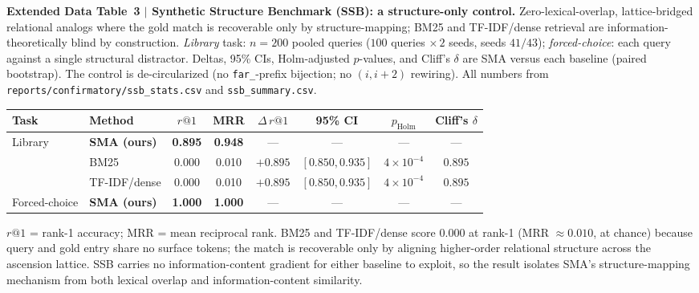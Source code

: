 \documentclass[pdflatex,sn-nature]{sn-jnl}
\newcommand{\edcaption}[1]{\par{\small #1}\par\smallskip}
\begin{document}
\begin{appendices}

\begin{table}[htbp]
\centering
\edcaption{\textbf{Extended Data Table~3 $|$ Synthetic Structure Benchmark (SSB): a
    structure-only control.}
  Zero-lexical-overlap, lattice-bridged relational analogs where the gold match is
  recoverable only by structure-mapping; BM25 and TF-IDF/dense retrieval are
  information-theoretically blind by construction. \emph{Library} task: $n{=}200$ pooled
  queries ($100$ queries $\times\,2$ seeds, seeds $41/43$); \emph{forced-choice}: each query
  against a single structural distractor. Deltas, 95\% CIs, Holm-adjusted $p$-values, and
  Cliff's $\delta$ are SMA versus each baseline (paired bootstrap). The control is
  de-circularized (no \texttt{far\_}-prefix bijection; no $(i,i{+}2)$ rewiring).
  All numbers from \texttt{reports/confirmatory/ssb\_stats.csv} and \texttt{ssb\_summary.csv}.}
\small
\setlength{\tabcolsep}{5pt}
\begin{adjustbox}{max width=\textwidth}\begin{tabular}{llcccccc}
\toprule
\textbf{Task} & \textbf{Method} & \textbf{$r@1$} & \textbf{MRR} &
    \textbf{$\Delta\,r@1$} & \textbf{95\% CI} & \textbf{$p_{\mathrm{Holm}}$} & \textbf{Cliff's $\delta$} \\
\midrule
\multirow{3}{*}{Library}
  & \textbf{SMA (ours)} & \textbf{0.895} & \textbf{0.948} & --- & --- & --- & --- \\
  & BM25                & 0.000 & 0.010 & $+0.895$ & $[0.850, 0.935]$ & $4{\times}10^{-4}$ & $0.895$ \\
  & TF-IDF/dense        & 0.000 & 0.010 & $+0.895$ & $[0.850, 0.935]$ & $4{\times}10^{-4}$ & $0.895$ \\
\midrule
Forced-choice
  & \textbf{SMA (ours)} & \textbf{1.000} & \textbf{1.000} & --- & --- & --- & --- \\
\bottomrule
\end{tabular}\end{adjustbox}
\begin{flushleft}
{\footnotesize
$r@1$ = rank-1 accuracy; MRR = mean reciprocal rank. BM25 and TF-IDF/dense score $0.000$ at
rank-1 (MRR $\approx 0.010$, at chance) because query and gold entry share no surface tokens;
the match is recoverable only by aligning higher-order relational structure across the
ascension lattice. SSB carries no information-content gradient for either baseline to exploit,
so the result isolates SMA's structure-mapping mechanism from both lexical overlap and
information-content similarity.}
\end{flushleft}
\label{tab:ed3_ssb}
\end{table}



\end{appendices}
\end{document}
